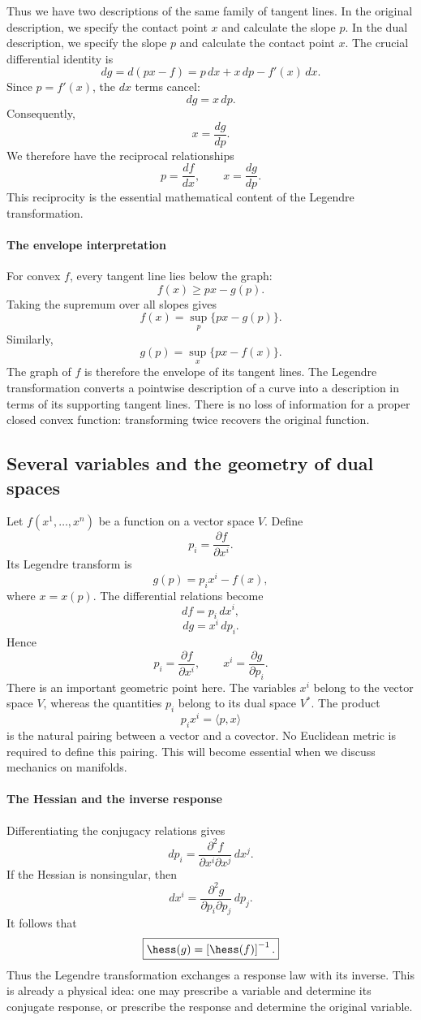 Thus we have two descriptions of the same family of tangent lines.
In the original description, we specify the contact point \(x\) and calculate
the slope \(p\). In the dual description, we specify the slope \(p\) and
calculate the contact point \(x\).
The crucial differential identity is
\[
dg=d(px-f)
=p\,dx+x\,dp-f'(x)\,dx.
\]
Since \(p=f'(x)\), the \(dx\) terms cancel:
\[
\boxed{dg=x\,dp.}
\]
Consequently,
\[
\boxed{x=\frac{dg}{dp}.}
\]
We therefore have the reciprocal relationships
\[
\boxed{
p=\frac{df}{dx},
\qquad
x=\frac{dg}{dp}.
}
\]
This reciprocity is the essential mathematical content of the Legendre
transformation.

\paragraph{The envelope interpretation}
For convex \(f\), every tangent line lies below the graph:
\[
f(x)\geq px-g(p).
\]
Taking the supremum over all slopes gives
\[
\boxed{f(x)=\sup_p\{px-g(p)\}.}
\]
Similarly,
\[
\boxed{g(p)=\sup_x\{px-f(x)\}.}
\]
The graph of \(f\) is therefore the envelope of its tangent lines.
The Legendre transformation converts a pointwise description of a curve into a
description in terms of its supporting tangent lines.
There is no loss of information for a proper closed convex function:
transforming twice recovers the original function.

\subsection{Several variables and the geometry of dual spaces}
Let \(f(x^1,\ldots,x^n)\) be a function on a vector space \(V\). Define
\[
p_i=\frac{\partial f}{\partial x^i}.
\]
Its Legendre transform is
\[
g(p)=p_ix^i-f(x),
\]
where \(x=x(p)\).
The differential relations become
\[
df=p_i\,dx^i,
\]
\[
dg=x^i\,dp_i.
\]
Hence
\[
\boxed{
p_i=\frac{\partial f}{\partial x^i},
\qquad
x^i=\frac{\partial g}{\partial p_i}.
}
\]
There is an important geometric point here.
The variables \(x^i\) belong to the vector space \(V\), whereas the quantities \(p_i\) belong to its dual space \(V^*\).
The product
\[
p_ix^i=\langle p,x\rangle
\]
is the natural pairing between a vector and a covector.
No Euclidean metric is required to define this pairing.
This will become essential when we discuss mechanics on manifolds.

\paragraph{The Hessian and the inverse response}
Differentiating the conjugacy relations gives
\[
dp_i=\frac{\partial^2 f}{\partial x^i\partial x^j}\,dx^j.
\]
If the Hessian is nonsingular, then
\[
dx^i=\frac{\partial^2 g}{\partial p_i\partial p_j}\,dp_j.
\]
It follows that
\[
\boxed{\hess (g)
=\left[\hess (f)\right]^{-1}.}
\]
Thus the Legendre transformation exchanges a response law with its inverse.
This is already a physical idea: one may prescribe a variable and determine its
conjugate response, or prescribe the response and determine the original
variable.


